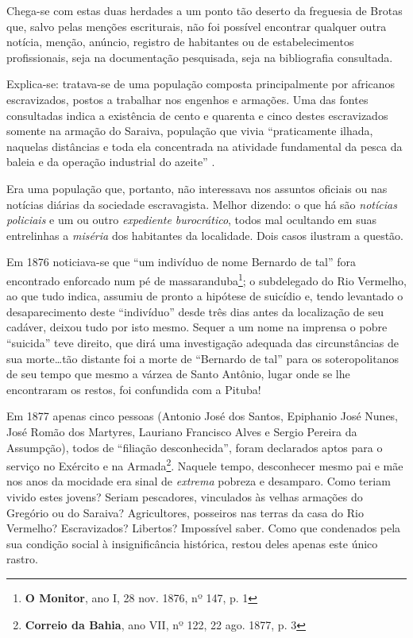 Chega-se com estas duas herdades a um ponto tão deserto da freguesia de Brotas que, salvo pelas menções escriturais, não foi possível encontrar qualquer outra notícia, menção, anúncio, registro de habitantes ou de estabelecimentos profissionais, seja na documentação pesquisada, seja na bibliografia consultada. 

Explica-se: tratava-se de uma população composta principalmente por africanos escravizados, postos a trabalhar nos engenhos e armações. Uma das fontes consultadas indica a existência de cento e quarenta e cinco destes escravizados somente na armação do Saraiva, população que vivia ``praticamente ilhada, naquelas distâncias e toda ela concentrada na atividade fundamental da pesca da baleia e da operação industrial do azeite'' \cite[p.~122]{SAMPAIO2005}.

Era uma população que, portanto, não interessava nos assuntos oficiais ou nas notícias diárias da sociedade escravagista. Melhor dizendo: o que há são \textit{notícias policiais} e um ou outro \textit{expediente burocrático}, todos mal ocultando em suas entrelinhas a \textit{miséria} dos habitantes da localidade. Dois casos ilustram a questão.

Em 1876 noticiava-se que ``um indivíduo de nome Bernardo de tal'' fora encontrado enforcado num pé de massaranduba\footnote{\textbf{O Monitor}, ano I, 28 nov. 1876, nº 147, p. 1}; o subdelegado do Rio Vermelho, ao que tudo indica, assumiu de pronto a hipótese de suicídio e, tendo levantado o desaparecimento deste ``indivíduo'' desde três dias antes da localização de seu cadáver, deixou tudo por isto mesmo. Sequer a um nome na imprensa o pobre ``suicida'' teve direito, que dirá uma investigação adequada das circunstâncias de sua morte\dots tão distante foi a morte de ``Bernardo de tal'' para os soteropolitanos de seu tempo que mesmo a várzea de Santo Antônio, lugar onde se lhe encontraram os restos, foi confundida com a Pituba!

Em 1877 apenas cinco pessoas (Antonio José dos Santos, Epiphanio José Nunes, José Romão dos Martyres, Lauriano Francisco Alves e Sergio Pereira da Assumpção), todos de ``filiação desconhecida'', foram declarados aptos para o serviço no Exército e na Armada\footnote{\textbf{Correio da Bahia}, ano VII, nº 122, 22 ago. 1877, p. 3}. Naquele tempo, desconhecer mesmo pai e mãe nos anos da mocidade era sinal de \textit{extrema} pobreza e desamparo. Como teriam vivido estes jovens? Seriam pescadores, vinculados às velhas armações do Gregório ou do Saraiva? Agricultores, posseiros nas terras da casa do Rio Vermelho? Escravizados? Libertos? Impossível saber. Como que condenados pela sua condição social à insignificância histórica, restou deles apenas este único rastro.

